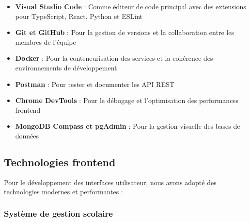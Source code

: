 \begin{itemize}
  \item \textbf{Visual Studio Code} : Comme éditeur de code principal avec des extensions pour TypeScript, React, Python et ESLint
  
  \item \textbf{Git et GitHub} : Pour la gestion de versions et la collaboration entre les membres de l'équipe
  
  \item \textbf{Docker} : Pour la conteneurisation des services et la cohérence des environnements de développement
  
  \item \textbf{Postman} : Pour tester et documenter les API REST
  
  \item \textbf{Chrome DevTools} : Pour le débogage et l'optimisation des performances frontend
  
  \item \textbf{MongoDB Compass et pgAdmin} : Pour la gestion visuelle des bases de données
\end{itemize}

\subsection{Technologies frontend}
Pour le développement des interfaces utilisateur, nous avons adopté des technologies modernes et performantes :

\subsubsection{Système de gestion scolaire}

